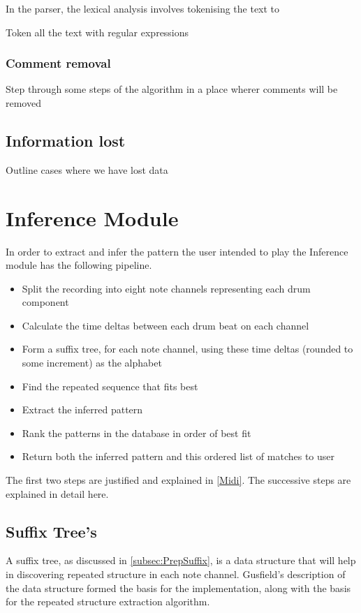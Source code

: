 \documentclass[12pt,twoside,notitlepage]{report}
\begin{document}
		
		In the parser, the lexical analysis involves tokenising the text to 
		
		Token all the text with regular expressions
			\subsubsection{Comment removal}
			Step through some steps of the algorithm in a place wherer comments will be removed
		\subsection{Information lost}
		Outline cases where we have lost data
	\section{Inference Module}

	In order to extract and infer the pattern the user intended to play the Inference module has the following pipeline.

	\begin{itemize}
		\item{Split the recording into eight note channels representing each drum component}
		\item{Calculate the time deltas between each drum beat on each channel}
		\item{Form a suffix tree, for each note channel, using these time deltas (rounded to some increment) as the alphabet}
		\item{Find the repeated sequence that fits best}
		\item{Extract the inferred pattern}
		\item{Rank the patterns in the database in order of best fit}
		\item{Return both the inferred pattern and this ordered list of matches to user}
	\end{itemize}
	
	The first two steps are justified and explained in \ref{Midi}. The successive steps are explained in detail here.
		\subsection{\label{subsec:SuffixTree}Suffix Tree's}
		A suffix tree, as discussed in \ref{subsec:PrepSuffix}, is a data structure that will help in discovering repeated structure in each note channel. Gusfield's\cite{Gusfield1999} description of the data structure formed the basis for the implementation, along with the basis for the repeated structure extraction algorithm.
		
\end{document}
